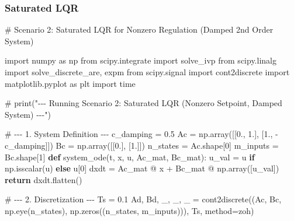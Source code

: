\documentclass[
  letterpaper,
  DIV=11,
  numbers=noendperiod,
  oneside]{scrartcl}
\newenvironment{Shaded}{\begin{snugshade}}{\end{snugshade}}
\newcommand{\CommentTok}[1]{\textcolor[rgb]{0.37,0.37,0.37}{#1}}
\newcommand{\ControlFlowTok}[1]{\textcolor[rgb]{0.00,0.23,0.31}{\textbf{#1}}}
\newcommand{\DecValTok}[1]{\textcolor[rgb]{0.68,0.00,0.00}{#1}}
\newcommand{\FloatTok}[1]{\textcolor[rgb]{0.68,0.00,0.00}{#1}}
\newcommand{\ImportTok}[1]{\textcolor[rgb]{0.00,0.46,0.62}{#1}}
\newcommand{\KeywordTok}[1]{\textcolor[rgb]{0.00,0.23,0.31}{\textbf{#1}}}
\newcommand{\NormalTok}[1]{\textcolor[rgb]{0.00,0.23,0.31}{#1}}
\newcommand{\OperatorTok}[1]{\textcolor[rgb]{0.37,0.37,0.37}{#1}}
\newcommand{\StringTok}[1]{\textcolor[rgb]{0.13,0.47,0.30}{#1}}
\begin{document}
\subsubsection{Saturated LQR}

\begin{Shaded}
\begin{Highlighting}[numbers=left,,]
\CommentTok{\# Scenario 2: Saturated LQR for Nonzero Regulation (Damped 2nd Order System)}

\ImportTok{import}\NormalTok{ numpy }\ImportTok{as}\NormalTok{ np}
\ImportTok{from}\NormalTok{ scipy.integrate }\ImportTok{import}\NormalTok{ solve\_ivp}
\ImportTok{from}\NormalTok{ scipy.linalg }\ImportTok{import}\NormalTok{ solve\_discrete\_are, expm}
\ImportTok{from}\NormalTok{ scipy.signal }\ImportTok{import}\NormalTok{ cont2discrete}
\ImportTok{import}\NormalTok{ matplotlib.pyplot }\ImportTok{as}\NormalTok{ plt}
\ImportTok{import}\NormalTok{ time}

\CommentTok{\# print("{-}{-}{-} Running Scenario 2: Saturated LQR (Nonzero Setpoint, Damped System) {-}{-}{-}")}

\CommentTok{\# {-}{-}{-} 1. System Definition {-}{-}{-}}
\NormalTok{c\_damping }\OperatorTok{=} \FloatTok{0.5}
\NormalTok{Ac }\OperatorTok{=}\NormalTok{ np.array([[}\FloatTok{0.}\NormalTok{, }\FloatTok{1.}\NormalTok{], [}\FloatTok{1.}\NormalTok{, }\OperatorTok{{-}}\NormalTok{c\_damping]])}
\NormalTok{Bc }\OperatorTok{=}\NormalTok{ np.array([[}\FloatTok{0.}\NormalTok{], [}\FloatTok{1.}\NormalTok{]])}
\NormalTok{n\_states }\OperatorTok{=}\NormalTok{ Ac.shape[}\DecValTok{0}\NormalTok{]}
\NormalTok{m\_inputs }\OperatorTok{=}\NormalTok{ Bc.shape[}\DecValTok{1}\NormalTok{]}
\KeywordTok{def}\NormalTok{ system\_ode(t, x, u, Ac\_mat, Bc\_mat):}
\NormalTok{    u\_val }\OperatorTok{=}\NormalTok{ u }\ControlFlowTok{if}\NormalTok{ np.isscalar(u) }\ControlFlowTok{else}\NormalTok{ u[}\DecValTok{0}\NormalTok{]}
\NormalTok{    dxdt }\OperatorTok{=}\NormalTok{ Ac\_mat }\OperatorTok{@}\NormalTok{ x }\OperatorTok{+}\NormalTok{ Bc\_mat }\OperatorTok{@}\NormalTok{ np.array([u\_val])}
    \ControlFlowTok{return}\NormalTok{ dxdt.flatten()}

\CommentTok{\# {-}{-}{-} 2. Discretization {-}{-}{-}}
\NormalTok{Ts }\OperatorTok{=} \FloatTok{0.1}
\NormalTok{Ad, Bd, \_, \_, \_ }\OperatorTok{=}\NormalTok{ cont2discrete((Ac, Bc, np.eye(n\_states), np.zeros((n\_states, m\_inputs))), Ts, method}\OperatorTok{=}\StringTok{\textquotesingle{}zoh\textquotesingle{}}\NormalTok{)}


\end{Highlighting}
\end{Shaded}
\end{document}
